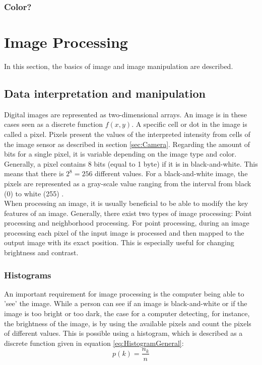 \subsubsection{Color?}
\section{Image Processing} \label{sec:ImageProcessingGeneral}
In this section, the basics of image and image manipulation are described. 

\subsection{Data interpretation and manipulation}
Digital images are represented as two-dimensional arrays. An image is in these cases seen as a discrete function $f(x,y)$. A specific cell or dot in the image is called a pixel. Pixels present the values of the interpreted intensity from cells of the image sensor as described in section \ref{sec:Camera}. Regarding the amount of bits for a single pixel, it is variable depending on the image type and color. Generally, a pixel contains 8 bits (equal to 1 byte) if it is in black-and-white. This means that there is $2^{8} = 256$ different values. For a black-and-white image, the pixels are represented as a gray-scale value ranging from the interval from black (0) to white (255) \citep{book:Moeslund}. \\

When processing an image, it is usually beneficial to be able to modify the key features of an image. Generally, there exist two types of image processing: Point processing and neighborhood processing. For point processing, during an image processing each pixel of the input image is processed and then mapped to the output image with its exact position. This is especially useful for changing brightness and contrast. 

\subsubsection*{Histograms}
An important requirement for image processing is the computer being able to 'see' the image. While a person can see if an image is black-and-white or if the image is too bright or too dark, the case for a computer detecting, for instance, the brightness of the image, is by using the available pixels and count the pixels of different values. This is possible using a histogram, which is described as a discrete function given in equation \ref{eq:HistogramGeneral}:
\begin{equation} \label{eq:HistogramGeneral}
    p(k) = \frac{n_k}{n}
\end{equation}

